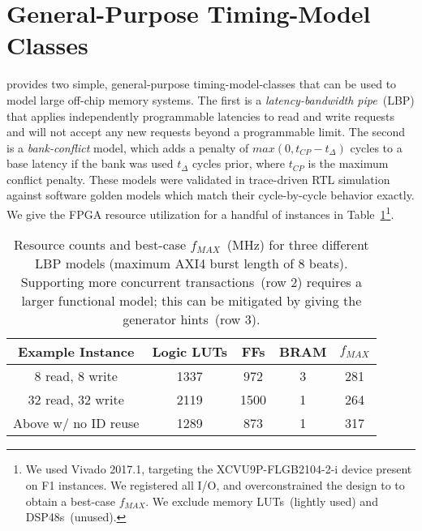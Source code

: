 \section{General-Purpose Timing-Model Classes}\label{sec:timing_model}

\PNAME provides two simple, general-purpose timing-model-classes that can be used to
model large off-chip memory systems. The first is a \emph{latency-bandwidth
pipe}~(LBP) that applies independently programmable latencies to read and write
requests and will not accept any new requests beyond a programmable limit. The
second is a \emph{bank-conflict} model, which adds a penalty of $max(0, t_{CP} -
t_{\Delta})$ cycles to a base latency if the bank was used
$t_{\Delta}$ cycles prior, where $t_{CP}$ is the maximum conflict penalty.
These models were validated in trace-driven RTL simulation against
software golden models which match their cycle-by-cycle behavior exactly.  We
give the FPGA resource utilization for a handful of
instances in Table~\ref{tbl:lbp-model-resources}\footnote{We
used Vivado 2017.1, targeting the XCVU9P-FLGB2104-2-i device present on F1
instances. We registered all I/O, and overconstrained the design
to  to obtain a best-case $f_{MAX}$. We exclude memory
LUTs~(lightly used) and DSP48s~(unused).}.

\begin{table}[htb]
\centering
    \begin{tabular}{c c c c c }
	\hline
        \textbf{Example Instance} & Logic LUTs & FFs & BRAM & $f_{MAX}$ \\
	\hline
        8 read, 8 write & 1337 & 972 & 3 &  281 \\
        32 read, 32 write & 2119 & 1500 & 1 & 264 \\
        Above w/ no ID reuse & 1289 & 873 & 1 & 317 \\
	\hline
	\end{tabular}
    \caption{Resource counts and best-case $f_{MAX}$~(MHz) for three different
    LBP models (maximum AXI4 burst length of 8 beats). Supporting more concurrent transactions~(row 2) requires a larger
    functional model; this can be mitigated by giving the generator hints~(row 3).}
\label{tbl:lbp-model-resources}
\end{table}

